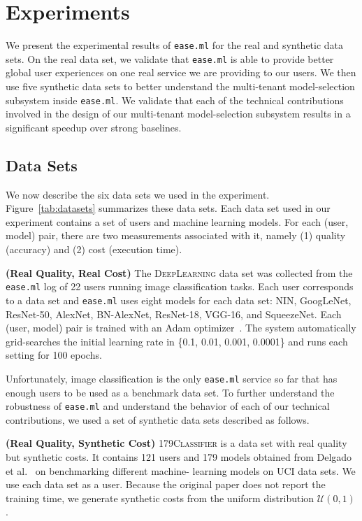 \documentclass[letterpaper]{vldb}
\newcommand{\eml}{\texttt{ease.ml}\xspace}
\begin{document}
\section{Experiments}\label{sec:experiments}

We present the experimental results of 
\eml for the real and synthetic data sets.
On the real data set, we validate that
\eml is able to provide
better global user experiences on one
real service we are providing to our users. 
We then use five synthetic data sets
to better understand the multi-tenant model-selection subsystem inside \eml. We validate
that each of the technical contributions 
involved in the design of our 
multi-tenant model-selection subsystem
results in a significant speedup
over strong baselines.

\subsection{Data Sets}

We now describe the six data sets we used
in the experiment. Figure~\ref{tab:datasets} summarizes these data sets.
Each data set used in our experiment 
contains a set of users and machine learning models. For each (user, model)
pair, there are two measurements
associated with it, namely (1) quality
(accuracy) and (2) cost
(execution time).

\vspace{0.5em}
\noindent
{\bf (Real Quality, Real Cost)} The 
\textsc{DeepLearning} data set was collected
from the \eml log of 22 users running image classification tasks. Each
user corresponds to a data set and
\eml uses eight models for
each data set:
NIN, GoogLeNet, ResNet-50, AlexNet, BN-AlexNet, ResNet-18, VGG-16, and SqueezeNet.
Each (user, model) pair is trained with
an Adam optimizer~\cite{XX}. The
system automatically grid-searches 
the initial learning rate in
\{0.1, 0.01, 0.001, 0.0001\} and
runs each setting for 100 epochs.

\vspace{0.5em}
Unfortunately, image classification 
is the only \eml service so far that
has enough users
to be used as a benchmark data set.
To further understand the robustness
of \eml and understand the
behavior of each of our technical
contributions, we used a set
of synthetic data sets described
as follows.

\vspace{0.5em}
\noindent
{\bf (Real Quality, Synthetic Cost)} 
\textsc{179Classifier}
is a data set with real quality 
but synthetic costs. It contains
121 users and 179 models obtained from
Delgado et al.~\cite{DelgadoCBA14}
on benchmarking different machine-
learning models on UCI data sets.
We use each data set as a user.
Because the original paper does not
report the training time, we 
generate synthetic costs from the uniform distribution $\mathcal{U}(0, 1)$.
\end{document}
